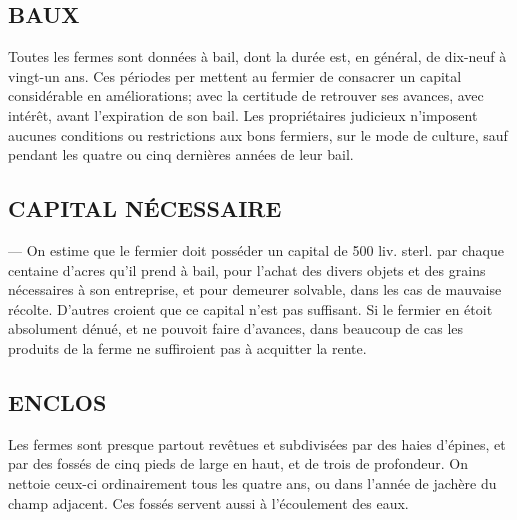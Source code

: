 \subsection{BAUX}
Toutes les fermes sont données à bail, dont la durée est, en général, de dix-neuf à vingt-un ans. Ces périodes per\setcounter{page}{77} mettent au fermier de consacrer un capital considérable en améliorations; avec la certitude de retrouver ses avances, avec intérêt, avant l'expiration de son bail. Les propriétaires judicieux n'imposent aucunes conditions ou restrictions aux bons fermiers, sur le mode de culture, sauf pendant les quatre ou cinq dernières années de leur bail.
\subsection{CAPITAL NÉCESSAIRE} — On estime que le fermier doit posséder un capital de 500 liv. sterl. par chaque centaine d'acres qu'il prend à bail, pour l'achat des divers objets et des grains nécessaires à son entreprise, et pour demeurer solvable, dans les cas de mauvaise récolte. D'autres croient que ce capital n'est pas suffisant. Si le fermier en étoit absolument dénué, et ne pouvoit faire d'avances, dans beaucoup de cas les produits de la ferme ne suffiroient pas à acquitter la rente.
\subsection{ENCLOS} Les fermes sont presque partout revêtues et subdivisées par des haies d'épines, et par des fossés de cinq pieds de large en haut, et de trois de profondeur. On nettoie ceux-ci ordinairement tous les quatre ans, ou dans l'année de jachère du champ adjacent. Ces fossés servent aussi à l'écoulement des eaux.

